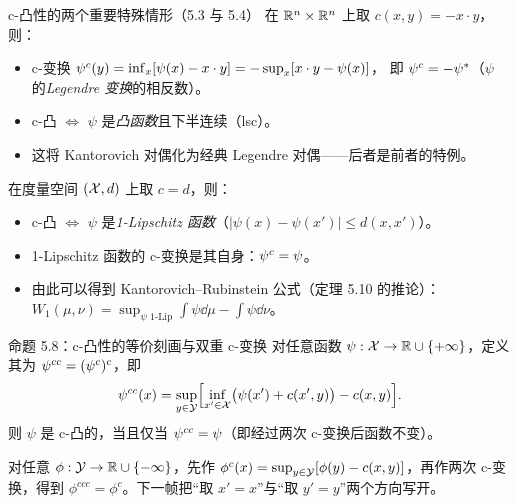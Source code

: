 \begin{frame}{c-凸性的两个重要特殊情形（5.3 与 5.4）}
  在 $\mathbb{R}^n\times\mathbb{R}^n$ 上取 $c(x,y)=-x\cdot y$，则：
  \begin{itemize}\small
    \item c-变换 ${\psi}^{c}(y)=\inf_{x}[\psi(x)-x\cdot y]=-\sup_{x}[x\cdot y-\psi(x)]$，
      即 ${\psi}^{c}=-\psi^*$（$\psi$ 的\emph{Legendre 变换}的相反数）。
    \item c-凸 $\Leftrightarrow$ $\psi$ 是\emph{凸函数}且下半连续（lsc）。
    \item 这将 Kantorovich 对偶化为经典 Legendre 对偶——后者是前者的特例。
  \end{itemize}

  \medskip
  在度量空间 $(\mathcal{X},d)$ 上取 $c=d$，则：
  \begin{itemize}\small
    \item c-凸 $\Leftrightarrow$ $\psi$ 是\emph{1-Lipschitz 函数}（$|\psi(x)-\psi(x')|\le d(x,x')$）。
    \item 1-Lipschitz 函数的 c-变换是其自身：${\psi}^{c}=\psi$。
    \item 由此可以得到 Kantorovich–Rubinstein 公式（定理 5.10 的推论）：
      $W_1(\mu,\nu)=\sup_{\psi\text{ 1-Lip}}\int\psi\dd\mu-\int\psi\dd\nu$。
  \end{itemize}

\end{frame}

\begin{frame}{命题 5.8：c-凸性的等价刻画与双重 c-变换}
  对任意函数 $\psi:\mathcal{X}\to\mathbb{R}\cup\{+\infty\}$，定义其为 ${\psi}^{cc}=({\psi}^{c})^c$，即
  \[
    {\psi}^{cc}(x) = \sup_{y\in\mathcal{Y}}\Bigl[\inf_{x'\in\mathcal{X}}\bigl(\psi(x')+c(x',y)\bigr)-c(x,y)\Bigr].
  \]
  则 $\psi$ 是 c-凸的，当且仅当 ${\psi}^{cc}=\psi$（即经过两次 c-变换后函数不变）。

  对任意 $\phi:\mathcal{Y}\to\mathbb{R}\cup\{-\infty\}$，先作
  $\phi^c(x)=\sup_{y\in\mathcal{Y}}[\phi(y)-c(x,y)]$，再作两次 c-变换，得到
  $\phi^{ccc}=\phi^c$。下一帧把“取 $x'=x$”与“取 $y'=y$”两个方向写开。

\end{frame}

